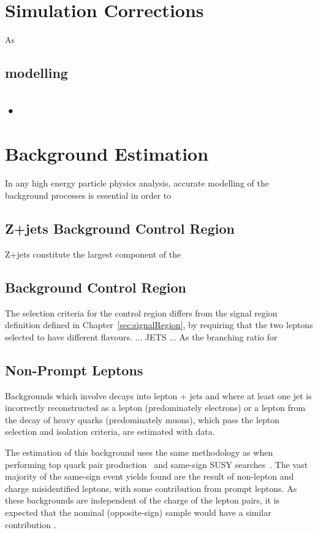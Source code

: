\section{Simulation Corrections}\label{sec:simCorrections}
As 
\subsection{\PU modelling}
\subsection{•}

\section{Background Estimation}\label{sec:bkgEst}
In any high energy particle physics analysis, accurate modelling of the background processes is essential in order to 
\subsection{Z+jets Background Control Region}\label{subsec:zPlusJetsCR}
Z+jets constitute the largest component of the 

\subsection{\ttbar Background Control Region}\label{subsec:ttbarCR}
The selection criteria for the \ttbar control region differs from the signal region definition defined in Chapter~\ref{sec:signalRegion}, by requiring that the two leptons selected to have different flavours.
... JETS ...
As the branching ratio for 

\subsection{Non-Prompt Leptons}\label{subsec:NPLs}
Backgrounds which involve decays into lepton + jets and where at least one jet is incorrectly reconstructed as a lepton (predominately electrons) or a lepton from the decay of heavy quarks (predominately muons), which pass the lepton selection and isolation criteria, are estimated with data.

The estimation of this background uses the same methodology as when performing top quark pair production~\cite{CMS:2016syx} and same-sign SUSY searches~\cite{CMS:2015vqc}.
The vast majority of the same-sign event yields found are the result of non-lepton and charge misidentified leptons, with some contribution from prompt leptons.
As these backgrounds are independent of the charge of the lepton pairs, it is expected that the nominal (opposite-sign) sample would have a similar contribution \cite{CMS:2015vqc}.

